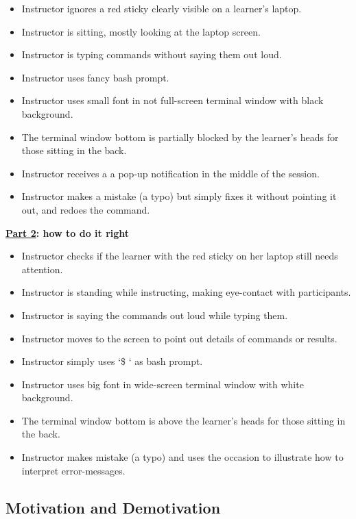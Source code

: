 \begin{itemize}
\item
  Instructor ignores a red sticky clearly visible on a learner's laptop.
\item
  Instructor is sitting, mostly looking at the laptop screen.
\item
  Instructor is typing commands without saying them out loud.
\item
  Instructor uses fancy bash prompt.
\item
  Instructor uses small font in not full-screen terminal window with
  black background.
\item
  The terminal window bottom is partially blocked by the learner's heads
  for those sitting in the back.
\item
  Instructor receives a a pop-up notification in the middle of the
  session.
\item
  Instructor makes a mistake (a typo) but simply fixes it without
  pointing it out, and redoes the command.
\end{itemize}

\textbf{\href{https://youtu.be/SkPmwe\_WjeY}{Part 2}: how to do it right}

\begin{itemize}
\item
  Instructor checks if the learner with the red sticky on her laptop
  still needs attention.
\item
  Instructor is standing while instructing, making eye-contact with
  participants.
\item
  Instructor is saying the commands out loud while typing them.
\item
  Instructor moves to the screen to point out details of commands or
  results.
\item
  Instructor simply uses `\$ ` as bash prompt.
\item
  Instructor uses big font in wide-screen terminal window with white
  background.
\item
  The terminal window bottom is above the learner's heads for those
  sitting in the back.
\item
  Instructor makes mistake (a typo) and uses the occasion to illustrate
  how to interpret error-messages.
\end{itemize}

\subsection{Motivation and
Demotivation}\label{motivation-and-demotivation}

